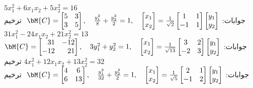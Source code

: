 \quad
$5x_1^2+6x_1x_2+5x_2^2=16$\\
جوابات:
$\bM{C}=\begin{bmatrix}5&3\\3&5  \end{bmatrix},\quad \tfrac{y_1^2}{8}+\tfrac{y_2^2}{2}=1,
\quad \begin{bmatrix}x_1\\x_2  \end{bmatrix}=\tfrac{1}{\sqrt{2}}\begin{bmatrix} 1&1\\-1&1 \end{bmatrix}\begin{bmatrix}y_1\\y_2  \end{bmatrix}$\,\, ترخیم
\quad
$31x_1^2-24x_1x_2+21x_2^2=13$\\
جوابات:
$\bM{C}=\begin{bmatrix*}[r]31&-12\\-12&21  \end{bmatrix*},\quad 3y_1^2+y_2^2=1,
\quad \begin{bmatrix}x_1\\x_2  \end{bmatrix}=\tfrac{1}{\sqrt{13}}\begin{bmatrix} 3&2\\-2&3 \end{bmatrix}\begin{bmatrix}y_1\\y_2  \end{bmatrix}$\,\, ترخیم
\quad
$4x_1^2+12x_1x_2+13x_2^2=32$\\
جوابات:
$\bM{C}=\begin{bmatrix}4&6\\6&13  \end{bmatrix},\quad \frac{y_1^2}{32}+\frac{y_2^2}{2}=1,
\quad \begin{bmatrix}x_1\\x_2  \end{bmatrix}=\tfrac{1}{\sqrt{5}}\begin{bmatrix} 2&1\\-1&2 \end{bmatrix}\begin{bmatrix}y_1\\y_2  \end{bmatrix}$\,\, ترخیم


